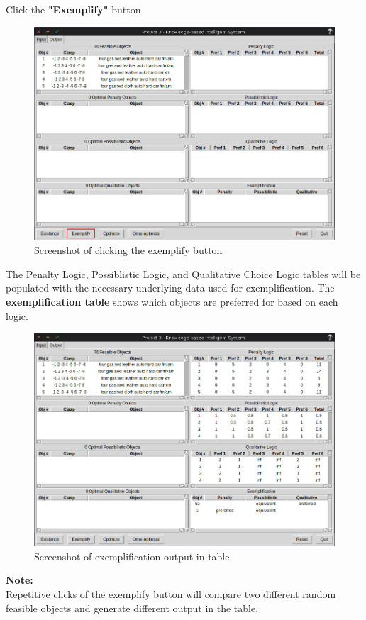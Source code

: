 \documentclass[12pt]{report}
\begin{document}
\begin{description}[leftmargin=4em]
\item [Step 1:] Click the \textbf{"Exemplify"} button
\begin{figure}[H]
\begin{center}
\includegraphics[scale=0.3,trim=1cm 1cm 1cm 1cm]{exemplify}
\caption{Screenshot of clicking the exemplify button}
\end{center}
\end{figure}
\vspace{-2.5em}
\item [Result:] The Penalty Logic, Possiblistic Logic, and Qualitative Choice Logic tables will be populated with the necessary underlying data used for exemplification. The \textbf{exemplification table} shows which objects are preferred for based on each logic.
\begin{figure}[H]
\begin{center}
\includegraphics[scale=0.3,trim=1cm 1cm 1cm 1cm]{post_exemplify}
\caption{Screenshot of exemplification output in table}
\end{center}
\end{figure}
\vspace{-2.5em}
\end{description}
\textbf{Note:} \\
Repetitive clicks of the exemplify button will compare two different random feasible objects and generate different output in the table.
\end{document}
